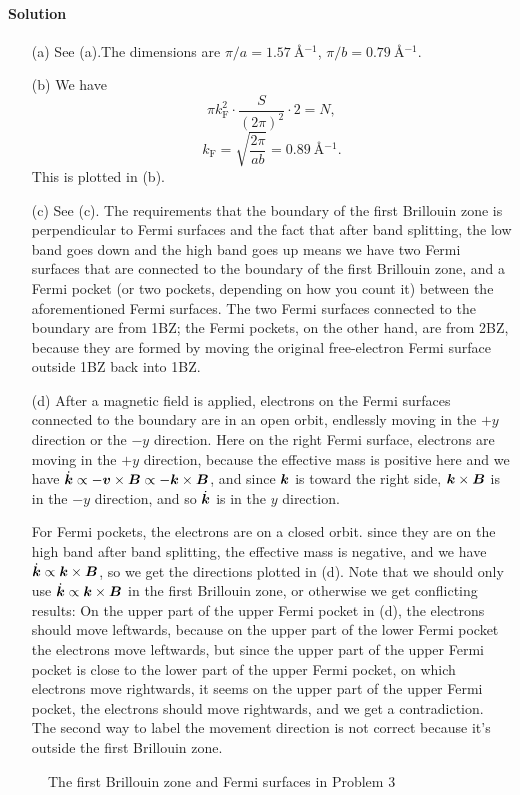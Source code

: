 \documentclass[hyperref, a4paper]{article}
\begin{document}
\paragraph{Solution} \begin{itemize}
\item[(a)] See (a).The dimensions are $\pi / a = \SI{1.57}{\angstrom^{-1}}$, 
$\pi / b = \SI{0.79}{\angstrom^{-1}}$.
\item[(b)] We have 
\[
    \pi k_{\text{F}}^2 \cdot \frac{S}{(2\pi)^2} \cdot 2 = N,
\]
\begin{equation}
    k_{\text{F}} = \sqrt{\frac{2\pi}{ab}} = \SI{0.89}{\angstrom^{-1}}.
\end{equation}
This is plotted in (b).
\item[(c)] See (c). 
The requirements that the boundary of the first Brillouin zone is perpendicular to Fermi surfaces
and the fact that after band splitting,
the low band goes down and the high band goes up 
means we have two Fermi surfaces that are connected to the boundary of the first Brillouin zone,
and a Fermi pocket (or two pockets, depending on how you count it) 
between the aforementioned Fermi surfaces. 
The two Fermi surfaces connected to the boundary are from 1BZ;
the Fermi pockets, on the other hand, are from 2BZ, 
because they are formed by moving the original free-electron Fermi surface outside 1BZ 
back into 1BZ.
\item[(d)] After a magnetic field is applied,
electrons on the Fermi surfaces connected to the boundary 
are in an open orbit,
endlessly moving in the $+y$ direction or the $-y$ direction.
Here on the right Fermi surface, electrons are moving in the $+y$ direction,
because the effective mass is positive here and we have 
$\dot{\vb*{k}} \propto - \vb*{v} \times \vb*{B} \propto - \vb*{k} \times \vb*{B}$,
and since $\vb*{k}$ is toward the right side, 
$\vb*{k} \times \vb*{B}$ is in the $- y$ direction, 
and so $\dot{\vb*{k}}$ is in the $y$ direction.

For Fermi pockets, the electrons are on a closed orbit.
since they are on the high band after band splitting,
the effective mass is negative,
and we have $\dot{\vb*{k}} \propto \vb*{k} \times \vb*{B}$,
so we get the directions plotted in (d).
Note that we should only use $\dot{\vb*{k}} \propto \vb*{k} \times \vb*{B}$
in the first Brillouin zone,
or otherwise we get conflicting results:
On the upper part of the upper Fermi pocket in (d),
the electrons should move leftwards,
because on the upper part of the lower Fermi pocket the electrons move leftwards,
but since the upper part of the upper Fermi pocket 
is close to the lower part of the upper Fermi pocket,
on which electrons move rightwards,
it seems on the upper part of the upper Fermi pocket, 
the electrons should move rightwards,
and we get a contradiction.
The second way to label the movement direction is not correct 
because it's outside the first Brillouin zone.

\end{itemize}

\begin{figure}
    \centering
    
    \caption{The first Brillouin zone and Fermi surfaces in Problem 3}
    \label{fig:problem-3}
\end{figure}
\end{document}
